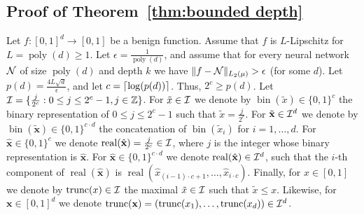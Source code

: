 \documentclass[11pt]{article}
\DeclarePairedDelimiter\ceil{\lceil}{\rceil}
\newcommand{\bx}{\mathbf{x}}
\newcommand{\ci}{{\cal I}}
\newcommand{\cn}{{\cal N}}
\newcommand{\integers}{{\mathbb Z}}
\DeclareMathOperator{\poly}{poly}
\DeclareMathOperator{\bin}{bin}
\DeclareMathOperator{\real}{real}
\DeclareMathOperator{\trunc}{trunc}
\newcommand{\snorm}[1]{\|#1\|} %
\newcommand{\tbx}{{\tilde{\bx}}}
\newcommand{\tx}{{\tilde{x}}}
\newcommand{\hbx}{{\hat{\bx}}}
\newcommand{\hx}{{\hat{x}}}
\begin{document}
\subsection{Proof of Theorem~\ref{thm:bounded depth}}
\label{app:proof of theorem bounded depth}

Let $f:[0,1]^d \rightarrow [0,1]$ be a benign function. Assume that $f$ is $L$-Lipschitz for $L=\poly(d) \geq 1$.
Let $\epsilon=\frac{1}{\poly(d)}$, and assume that for every neural network $\cn$ of size $\poly(d)$ and depth $k$ we have $\snorm{f-\cn}_{L_2(\mu)} > \epsilon$ (for some $d$).
 Let $p(d)=\frac{4 L \sqrt{d}}{\epsilon}$, and let $c = \ceil{\log(p(d))}$. Thus, $2^c \geq p(d)$.
Let $\ci = \{\frac{j}{2^c}: 0 \leq j \leq  2^c - 1, j \in \integers\}$. 
For $\tx \in \ci$ we denote by $\bin(\tx) \in \{0,1\}^c$ the binary representation of $0 \leq j \leq 2^c-1$ such that $\tx=\frac{j}{2^c}$. For $\tbx \in \ci^d$ we denote by $\bin(\tbx) \in \{0,1\}^{c \cdot d}$ the concatenation of $\bin(\tx_i)$ for $i=1,\ldots,d$.
For $\hbx \in \{0,1\}^c$ we denote $\real(\hbx) = \frac{j}{2^c} \in \ci$, where $j$ is the integer whose binary representation is $\hbx$. 
For $\hbx \in \{0,1\}^{c \cdot d}$ we denote $\real(\hbx) \in \ci^d$, such that the $i$-th component of $\real(\hbx)$ is $\real(\hx_{(i-1) \cdot c + 1},\ldots,\hx_{i \cdot c})$.
Finally, for $x \in [0,1]$ we denote by $\trunc(x) \in \ci$ the maximal $\tx \in \ci$ such that $\tx \leq x$. Likewise, for $\bx \in [0,1]^d$ we denote $\trunc(\bx) = (\trunc(x_1),\ldots,\trunc(x_d)) \in \ci^d$.
\end{document}
